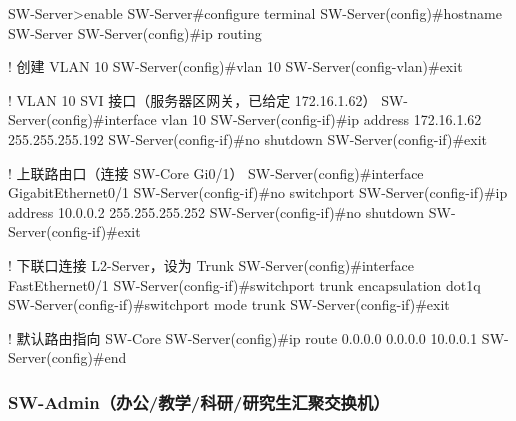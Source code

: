 \documentclass[12pt,a4paper]{ctexart}
\begin{document}
\begin{codeblock}
SW-Server>enable
SW-Server#configure terminal
SW-Server(config)#hostname SW-Server
SW-Server(config)#ip routing

! 创建 VLAN 10
SW-Server(config)#vlan 10
SW-Server(config-vlan)#exit

! VLAN 10 SVI 接口（服务器区网关，已给定 172.16.1.62）
SW-Server(config)#interface vlan 10
SW-Server(config-if)#ip address 172.16.1.62 255.255.255.192
SW-Server(config-if)#no shutdown
SW-Server(config-if)#exit

! 上联路由口（连接 SW-Core Gi0/1）
SW-Server(config)#interface GigabitEthernet0/1
SW-Server(config-if)#no switchport
SW-Server(config-if)#ip address 10.0.0.2 255.255.255.252
SW-Server(config-if)#no shutdown
SW-Server(config-if)#exit

! 下联口连接 L2-Server，设为 Trunk
SW-Server(config)#interface FastEthernet0/1
SW-Server(config-if)#switchport trunk encapsulation dot1q
SW-Server(config-if)#switchport mode trunk
SW-Server(config-if)#exit

! 默认路由指向 SW-Core
SW-Server(config)#ip route 0.0.0.0 0.0.0.0 10.0.0.1
SW-Server(config)#end
\end{codeblock}

\subsubsection{SW-Admin（办公/教学/科研/研究生汇聚交换机）}
\end{document}

